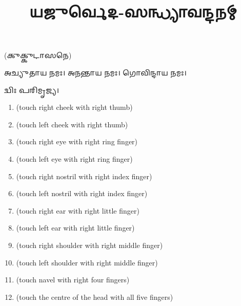 \setmainfont[Scale=0.50,Script=Grantha,Mapping=tex-text,Mapping=devanagarinumerals,AutoFakeBold=2.0]{Noto Serif Grantha}
\title{\Huge 𑌯𑌜𑍁𑌰𑍍𑌵𑍇𑌦-𑌸𑌨𑍍𑌧𑍍𑌯𑌾𑌵𑌨𑍍𑌦𑌨𑌮𑍍}
\date{}
\maketitle
\tableofcontents 

\clearpage
{}
\renewcommand{\sectionmark}[1]{%
\markboth{\large #1 (𑌪𑍍𑌰𑌾𑌤𑌃 𑌸𑌨𑍍𑌧𑍍𑌯𑌾)}{}}

(𑌕𑍁𑌕𑍍𑌕𑍁𑌟𑌾𑌸𑌨𑍇)

𑌅𑌚𑍍𑌯𑍁𑌤𑌾𑌯 𑌨𑌮𑌃। 𑌅𑌨𑌨𑍍𑌤𑌾𑌯 𑌨𑌮𑌃। 𑌗𑍋𑌵𑌿𑌨𑍍𑌦𑌾𑌯 𑌨𑌮𑌃। 

𑌦𑍍𑌵𑌿𑌃 𑌪𑌰𑌿𑌮𑍃𑌜𑍍𑌯।


\begin{enumerate}
    \item {} {\scriptsize (touch right cheek with right thumb)}
    \item {} {\scriptsize (touch left cheek with right thumb)}
    \item {} {\scriptsize (touch right eye with right ring finger)}
    \item {} {\scriptsize (touch left eye with right ring finger)}
    \item {} {\scriptsize (touch right nostril with right index finger)}
    \item {} {\scriptsize (touch left nostril with right index finger)}
    \item {} {\scriptsize (touch right ear with right little finger)}
    \item {} {\scriptsize (touch left ear with right little finger)}
    \item {} {\scriptsize (touch right shoulder with right middle finger)}
    \item {} {\scriptsize (touch left shoulder with right middle finger)}
    \item {} {\scriptsize (touch navel with right four fingers)}
    \item {} {\scriptsize (touch the centre of the head with all five fingers)}
\end{enumerate}


